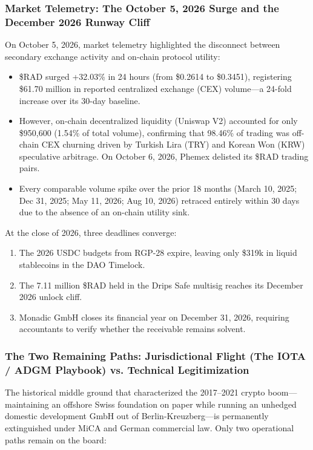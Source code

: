 \documentclass[a4paper,11pt,twoside,parskip=half-,headings=small]{scrartcl}
\begin{document}
\subsubsection{Market Telemetry: The October 5, 2026 Surge and the December 2026 Runway Cliff}
\label{sec:october_telemetry_cliff}

On October 5, 2026, market telemetry highlighted the disconnect between secondary exchange activity and on-chain protocol utility:
\begin{itemize}
  \item \$RAD surged +32.03\% in 24 hours (from \$0.2614 to \$0.3451), registering \$61.70 million in reported centralized exchange (CEX) volume---a 24-fold increase over its 30-day baseline.
  \item However, on-chain decentralized liquidity (Uniswap V2) accounted for only \$950,600 (1.54\% of total volume), confirming that 98.46\% of trading was off-chain CEX churning driven by Turkish Lira (TRY) and Korean Won (KRW) speculative arbitrage. On October 6, 2026, Phemex delisted its \$RAD trading pairs.
  \item Every comparable volume spike over the prior 18 months (March 10, 2025; Dec 31, 2025; May 11, 2026; Aug 10, 2026) retraced entirely within 30 days due to the absence of an on-chain utility sink.
\end{itemize}
At the close of 2026, three deadlines converge:
\begin{enumerate}
  \item The 2026 USDC budgets from RGP-28 expire, leaving only \$319k in liquid stablecoins in the DAO Timelock.
  \item The 7.11 million \$RAD held in the Drips Safe multisig reaches its December 2026 unlock cliff.
  \item Monadic GmbH closes its financial year on December 31, 2026, requiring accountants to verify whether the  receivable remains solvent.
\end{enumerate}

\subsubsection{The Two Remaining Paths: Jurisdictional Flight (The IOTA / ADGM Playbook) vs. Technical Legitimization}
\label{sec:two_paths_iota_vs_legitimacy}

The historical middle ground that characterized the 2017--2021 crypto boom---maintaining an offshore Swiss foundation on paper while running an unhedged domestic development GmbH out of Berlin-Kreuzberg---is permanently extinguished under MiCA and German commercial law. Only two operational paths remain on the board:
\end{document}
